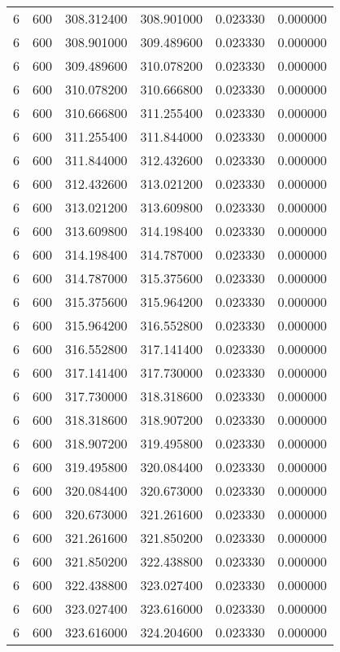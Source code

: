 \begin{longtable}{rrrrrr}
6 & 600 & 308.312400 & 308.901000 & 0.023330 & 0.000000 \\
6 & 600 & 308.901000 & 309.489600 & 0.023330 & 0.000000 \\
6 & 600 & 309.489600 & 310.078200 & 0.023330 & 0.000000 \\
6 & 600 & 310.078200 & 310.666800 & 0.023330 & 0.000000 \\
6 & 600 & 310.666800 & 311.255400 & 0.023330 & 0.000000 \\
6 & 600 & 311.255400 & 311.844000 & 0.023330 & 0.000000 \\
6 & 600 & 311.844000 & 312.432600 & 0.023330 & 0.000000 \\
6 & 600 & 312.432600 & 313.021200 & 0.023330 & 0.000000 \\
6 & 600 & 313.021200 & 313.609800 & 0.023330 & 0.000000 \\
6 & 600 & 313.609800 & 314.198400 & 0.023330 & 0.000000 \\
6 & 600 & 314.198400 & 314.787000 & 0.023330 & 0.000000 \\
6 & 600 & 314.787000 & 315.375600 & 0.023330 & 0.000000 \\
6 & 600 & 315.375600 & 315.964200 & 0.023330 & 0.000000 \\
6 & 600 & 315.964200 & 316.552800 & 0.023330 & 0.000000 \\
6 & 600 & 316.552800 & 317.141400 & 0.023330 & 0.000000 \\
6 & 600 & 317.141400 & 317.730000 & 0.023330 & 0.000000 \\
6 & 600 & 317.730000 & 318.318600 & 0.023330 & 0.000000 \\
6 & 600 & 318.318600 & 318.907200 & 0.023330 & 0.000000 \\
6 & 600 & 318.907200 & 319.495800 & 0.023330 & 0.000000 \\
6 & 600 & 319.495800 & 320.084400 & 0.023330 & 0.000000 \\
6 & 600 & 320.084400 & 320.673000 & 0.023330 & 0.000000 \\
6 & 600 & 320.673000 & 321.261600 & 0.023330 & 0.000000 \\
6 & 600 & 321.261600 & 321.850200 & 0.023330 & 0.000000 \\
6 & 600 & 321.850200 & 322.438800 & 0.023330 & 0.000000 \\
6 & 600 & 322.438800 & 323.027400 & 0.023330 & 0.000000 \\
6 & 600 & 323.027400 & 323.616000 & 0.023330 & 0.000000 \\
6 & 600 & 323.616000 & 324.204600 & 0.023330 & 0.000000 \\

\end{longtable}
